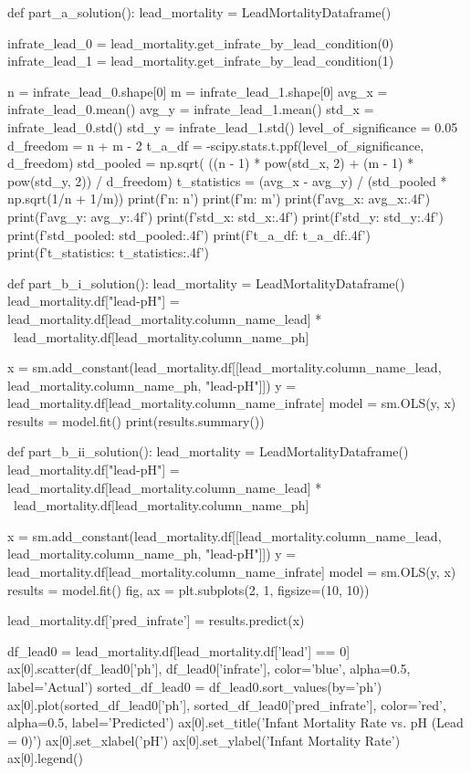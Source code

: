 \documentclass{uofa-eng-assignment}
\begin{document}
\begin{python}
def part_a_solution():
    lead_mortality = LeadMortalityDataframe()

    infrate_lead_0 = lead_mortality.get_infrate_by_lead_condition(0)
    infrate_lead_1 = lead_mortality.get_infrate_by_lead_condition(1)

    n = infrate_lead_0.shape[0]
    m = infrate_lead_1.shape[0]
    avg_x = infrate_lead_0.mean()
    avg_y = infrate_lead_1.mean()
    std_x = infrate_lead_0.std()
    std_y = infrate_lead_1.std()
    level_of_significance = 0.05
    d_freedom = n + m - 2
    t_a_df = -scipy.stats.t.ppf(level_of_significance, d_freedom)
    std_pooled = np.sqrt(
        ((n - 1) * pow(std_x, 2) + (m - 1) * pow(std_y, 2)) / d_freedom)
    t_statistics = (avg_x - avg_y) / (std_pooled * np.sqrt(1/n + 1/m))
    print(f'n: {n}')
    print(f'm: {m}')
    print(f'avg_x: {avg_x:.4f}')
    print(f'avg_y: {avg_y:.4f}')
    print(f'std_x: {std_x:.4f}')
    print(f'std_y: {std_y:.4f}')
    print(f'std_pooled: {std_pooled:.4f}')
    print(f't_a_df: {t_a_df:.4f}')
    print(f't_statistics: {t_statistics:.4f}')


def part_b_i_solution():
    lead_mortality = LeadMortalityDataframe()
    lead_mortality.df["lead-pH"] = lead_mortality.df[lead_mortality.column_name_lead] * \
        lead_mortality.df[lead_mortality.column_name_ph]

    x = sm.add_constant(lead_mortality.df[[lead_mortality.column_name_lead,
                                           lead_mortality.column_name_ph, "lead-pH"]])
    y = lead_mortality.df[lead_mortality.column_name_infrate]
    model = sm.OLS(y, x)
    results = model.fit()
    print(results.summary())


def part_b_ii_solution():
    lead_mortality = LeadMortalityDataframe()
    lead_mortality.df["lead-pH"] = lead_mortality.df[lead_mortality.column_name_lead] * \
        lead_mortality.df[lead_mortality.column_name_ph]

    x = sm.add_constant(lead_mortality.df[[lead_mortality.column_name_lead,
                                           lead_mortality.column_name_ph, "lead-pH"]])
    y = lead_mortality.df[lead_mortality.column_name_infrate]
    model = sm.OLS(y, x)
    results = model.fit()
    fig, ax = plt.subplots(2, 1, figsize=(10, 10))

    lead_mortality.df['pred_infrate'] = results.predict(x)

    df_lead0 = lead_mortality.df[lead_mortality.df['lead'] == 0]
    ax[0].scatter(df_lead0['ph'], df_lead0['infrate'],
                  color='blue', alpha=0.5, label='Actual')
    sorted_df_lead0 = df_lead0.sort_values(by='ph')
    ax[0].plot(sorted_df_lead0['ph'], sorted_df_lead0['pred_infrate'],
               color='red', alpha=0.5, label='Predicted')
    ax[0].set_title('Infant Mortality Rate vs. pH (Lead = 0)')
    ax[0].set_xlabel('pH')
    ax[0].set_ylabel('Infant Mortality Rate')
    ax[0].legend()


\end{python}
\end{document}
